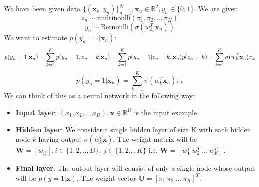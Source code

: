 \documentclass[a4paper,11pt]{article}
\begin{document}
\begin{mlsolution}
We have been given data $\{(\textbf{x}_{n}, y_{n})\}_{n=1}^{N}, \textbf{x}_{n}\in \mathbb{R}^{2}, y_n\in \{0,1\}$. We are given 
\[
z_n \sim \text{multinoulli}(\pi_{1}, \pi_{2},..,\pi_{K})
\]
\[
y_n \sim \text{Bernoulli}(\sigma(w^{T}_{z_n}\textbf{x}_{n}))
\]
We want to estimate $p(y_n =1|\textbf{x}_n)$:
\begin{equation*}
p(y_n =1|\textbf{x}_n) = \sum_{k=1}^{K}p(y_n = 1, z_{n} = k|\textbf{x}_n) \\ 
 = \sum_{k=1}^{K}p(y_n = 1 |  z_{n} = k, \textbf{x}_n)p(z_n = k) \\ 
 = \sum_{k=1}^{K} \sigma(w^{T}_{k}\textbf{x}_{n})\pi_{k}
\end{equation*}
\[
\boxed{p(y_n =1|\textbf{x}_n) = \sum_{k=1}^{K} \sigma(w^{T}_{k}\textbf{x}_{n})\pi_{k}}
\]
We can think of this as a neural network in the following way:
\begin{itemize}
	\item \textbf{Input layer}: $(x_{1}, x_{2},..,x_{D}), \textbf{x}\in \mathbb{R}^{D}$ is the input example.
	\item \textbf{Hidden layer}: We consider a single hidden layer of size K with each hidden node $k$ having output $\sigma(w^{T}_{k}\textbf{x})$. The weight matrix will be $\textbf{W} = [w_{ij}], i \in \{1,2,..,D\}, \ j \in \{1,2.,,K\}$ i.e. $\textbf{W} = [w^{T}_{1} \  w^{T}_{2} \ ... \  w^{T}_{K}]$.
	\item \textbf{Final layer}: The output layer will consist of only a single node whose output will be $p(y = 1 | \textbf{x})$. The weight vector $\textbf{U} = [\pi_{1} \ \pi_{2} \ ... \ \pi_{K}]^{T}$.
\end{itemize}

\end{mlsolution}
\end{document}
